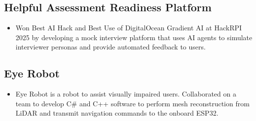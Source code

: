 \documentclass[11pt]{article}
\begin{document}
\subsection*{Helpful Assessment Readiness Platform}
\begin{itemize}
    \item Won Best AI Hack and Best Use of DigitalOcean Gradient AI at HackRPI 2025 by developing a mock interview platform that uses AI agents to simulate interviewer personas and provide automated feedback to users.
\end{itemize}

\subsection*{Eye Robot}
\begin{itemize}
    \item Eye Robot is a robot to assist visually impaired users. Collaborated on a team to develop C\# and C++ software to perform mesh reconstruction from LiDAR and transmit navigation commands to the onboard ESP32.
\end{itemize}
\end{document}
